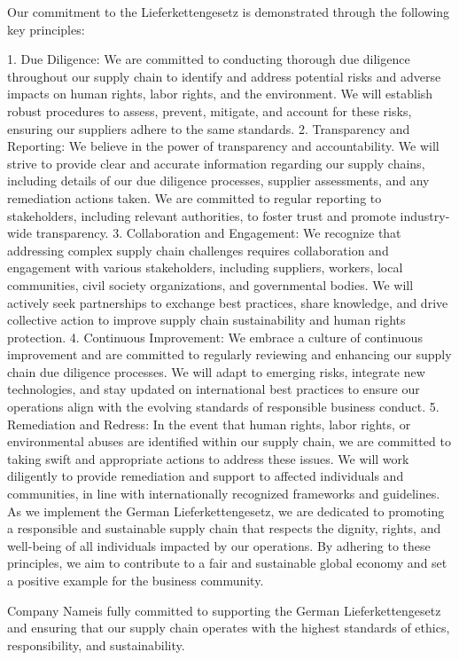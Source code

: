 \documentclass{article}
\def\companyname{Company Name}
\begin{document}
Our commitment to the Lieferkettengesetz is demonstrated through the following key principles:

1. Due Diligence: We are committed to conducting thorough due diligence throughout our supply chain to identify and address potential risks and adverse impacts
on human rights, labor rights, and the environment. We will establish robust procedures to assess, prevent, mitigate, and account for these risks, ensuring
our suppliers adhere to the same standards.
2. Transparency and Reporting: We believe in the power of transparency and accountability. We will strive to provide clear and accurate information regarding
our supply chains, including details of our due diligence processes, supplier assessments, and any remediation actions taken. We are committed to regular reporting
to stakeholders, including relevant authorities, to foster trust and promote industry-wide transparency.
3. Collaboration and Engagement: We recognize that addressing complex supply chain challenges requires collaboration and engagement with various stakeholders,
including suppliers, workers, local communities, civil society organizations, and governmental bodies. We will actively seek partnerships to exchange best practices,
share knowledge, and drive collective action to improve supply chain sustainability and human rights protection.
4. Continuous Improvement: We embrace a culture of continuous improvement and are committed to regularly reviewing and enhancing our supply chain due diligence processes.
We will adapt to emerging risks, integrate new technologies, and stay updated on international best practices to ensure our operations align with the evolving
standards of responsible business conduct.
5. Remediation and Redress: In the event that human rights, labor rights, or environmental abuses are identified within our supply chain, we are committed to taking
swift and appropriate actions to address these issues. We will work diligently to provide remediation and support to affected individuals and communities, in line
with internationally recognized frameworks and guidelines.
As we implement the German Lieferkettengesetz, we are dedicated to promoting a responsible and sustainable supply chain that respects the dignity, rights, and
well-being of all individuals impacted by our operations. By adhering to these principles, we aim to contribute to a fair and sustainable global economy and set
a positive example for the business community.

\companyname is fully committed to supporting the German Lieferkettengesetz and ensuring that our supply chain operates with the highest standards of ethics,
responsibility, and sustainability.
\end{document}
